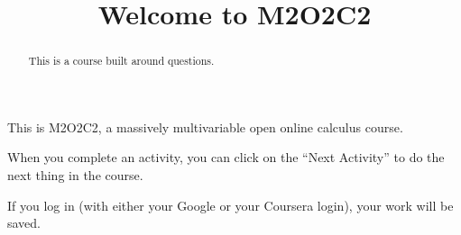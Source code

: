 \documentclass{ximera}
\title{Welcome to M2O2C2}
\begin{document}
\begin{abstract}
  This is a course built around questions.
\end{abstract}\maketitle

This is M2O2C2, a massively multivariable open online calculus course.

When you complete an activity, you can click on the ``Next Activity'' to do the next thing in the course.

If you log in (with either your Google or your Coursera login), your work will be saved.
\end{document}
